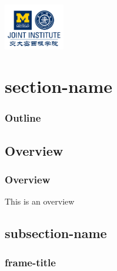 \documentclass[11pt, t]{beamer}
\author{Pingbang Hu}
\begin{document}
\begin{frame}
    \titlepage
    \begin{center}
        \includegraphics[height=2cm]{Figures/logo/logo2.png}
    \end{center}
\end{frame}

\section{section-name}
\begin{frame}
    \frametitle{Outline}
    \begin{spacing}{1.2}
        \tableofcontents[currentsubsection,hideothersubsections,sectionstyle=hide]
    \end{spacing}
\end{frame}

\subsection{Overview}
\begin{frame}
    \frametitle{Overview}
    This is an overview
    \vspace{1cm}
\end{frame}

\subsection{subsection-name}
\begin{frame}[allowframebreaks]
    \frametitle{frame-title}

\end{frame}
\end{document}
